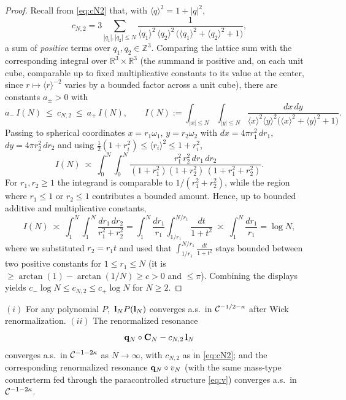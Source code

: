 \begin{proof}
Recall from \eqref{eq:cN2} that, with $\langle q\rangle^2=1+|q|^2$,
\[
c_{N,2}=3\sum_{|q_1|,|q_2|\le N}\frac{1}{\langle q_1\rangle^2\,\langle q_2\rangle^2\,\bigl(\langle q_1\rangle^2+\langle q_2\rangle^2+1\bigr)},
\]
a sum of \emph{positive} terms over $q_1,q_2\in\mathbb Z^3$. Comparing the lattice
sum with the corresponding integral over $\mathbb R^3\times\mathbb R^3$ (the summand
is positive and, on each unit cube, comparable up to fixed multiplicative constants
to its value at the center, since $r\mapsto\langle r\rangle^{-2}$ varies by a bounded
factor across a unit cube), there are constants $a_\pm>0$ with
\[
a_-\,I(N)\ \le\ c_{N,2}\ \le\ a_+\,I(N),\qquad
I(N):=\int_{|x|\le N}\!\!\int_{|y|\le N}\frac{dx\,dy}{\langle x\rangle^2\langle y\rangle^2\bigl(\langle x\rangle^2+\langle y\rangle^2+1\bigr)} .
\]
Passing to spherical coordinates $x=r_1\omega_1$, $y=r_2\omega_2$ with
$dx=4\pi r_1^2\,dr_1$, $dy=4\pi r_2^2\,dr_2$ and using
$\tfrac12(1+r_i^2)\le\langle r_i\rangle^2\le 1+r_i^2$,
\[
I(N)\ \asymp\ \int_0^N\!\!\int_0^N\frac{r_1^2\,r_2^2\,dr_1\,dr_2}{(1+r_1^2)(1+r_2^2)\,(1+r_1^2+r_2^2)} .
\]
For $r_1,r_2\ge1$ the integrand is comparable to $1/(r_1^2+r_2^2)$, while the region
where $r_1\le1$ or $r_2\le1$ contributes a bounded amount. Hence, up to bounded
additive and multiplicative constants,
\[
I(N)\ \asymp\ \int_1^N\!\!\int_1^N\frac{dr_1\,dr_2}{r_1^2+r_2^2}
=\int_1^N\frac{dr_1}{r_1}\int_{1/r_1}^{N/r_1}\frac{dt}{1+t^2}
\ \asymp\ \int_1^N\frac{dr_1}{r_1}=\log N,
\]
where we substituted $r_2=r_1 t$ and used that $\int_{1/r_1}^{N/r_1}\frac{dt}{1+t^2}$
stays bounded between two positive constants for $1\le r_1\le N$ (it is
$\ge\arctan(1)-\arctan(1/N)\ge c>0$ and $\le\pi$). Combining the displays yields
$c_-\log N\le c_{N,2}\le c_+\log N$ for $N\ge2$.
\end{proof}

\begin{qonelemma}\label{lem:std}
$(i)$ For any polynomial $P$, $\,\mathbf{l}_N P(\mathbf{l}_N)$ converges a.s.\ in
$\mathcal{C}^{-1/2-\kappa}$ after Wick renormalization. $(ii)$ The renormalized resonance
\[
\mathbf{q}_N\circ\mathbf{C}_N-c_{N,2}\,\mathbf{l}_N
\]
converges a.s.\ in $\mathcal{C}^{-1-2\kappa}$ as $N\to\infty$, with $c_{N,2}$ as in
\eqref{eq:cN2}; and the corresponding renormalized resonance $\mathbf{q}_N\circ v_N$
(with the same mass-type counterterm fed through the paracontrolled structure
\eqref{eq:v}) converges a.s.\ in $\mathcal{C}^{-1-2\kappa}$.
\end{qonelemma}

